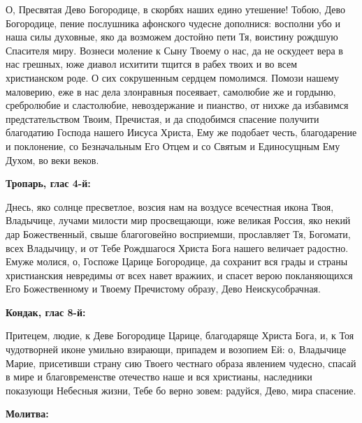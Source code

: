  

О, Пресвятая Дево Богородице, в скорбях наших едино утешение! Тобою, Дево Богородице, пение послушника афонского чудесне дополнися: восполни убо и наша силы духовные, яко да возможем достойно пети Тя, воистину рождшую Спасителя миру. Вознеси моление к Сыну Твоему о нас, да не оскудеет вера в нас грешных, юже диавол исхитити тщится в рабех твоих и во всем христианском роде. О сих сокрушенным сердцем помолимся. Помози нашему маловерию, еже в нас дела злонравныя посеявает, самолюбие же и гордыню, сребролюбие и сластолюбие, невоздержание и пианство, от нихже да избавимся предстательством Твоим, Пречистая, и да сподобимся спасение получити благодатию Господа нашего Иисуса Христа, Ему же подобает честь, благодарение и поклонение, со Безначальным Его Отцем и со Святым и Единосущным Ему Духом, во веки веков.
\nopagebreak\bigskip\bigskip\mychapterending

 


\bfseries Тропарь, глас 4-й:\normalfont{}\nopagebreak


Днесь, яко солнце пресветлое, возсия нам на воздусе всечестная икона Твоя, Владычице, лучами милости мир просвещающи, юже великая Россия, яко некий дар Божественный, свыше благоговейно восприемши, прославляет Тя, Богомати, всех Владычицу, и от Тебе Рождшагося Христа Бога нашего величает радостно. Емуже молися, о, Госпоже Царице Богородице, да сохранит вся грады и страны христианския невредимы от всех навет вражиих, и спасет верою покланяющихся Его Божественному и Твоему Пречистому образу, Дево Неискусобрачная.


\medskip


\bfseries Кондак, глас 8-й:\normalfont{}\nopagebreak


Притецем, людие, к Деве Богородице Царице, благодаряще Христа Бога, и, к Тоя чудотворней иконе умильно взирающи, припадем и возопием Ей: о, Владычице Марие, присетивши страну сию Твоего честнаго образа явлением чудесно, спасай в мире и благовременстве отечество наше и вся христианы, наследники показующи Небесныя жизни, Тебе бо верно зовем: радуйся, Дево, мира спасение.


\medskip


\bfseries Молитва:\normalfont{}\nopagebreak


